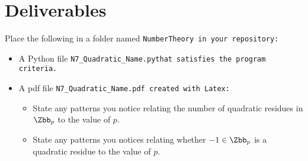 \documentclass{article}
\newcommand\foldername{\tt{NumberTheory} }
\newcommand\filename{\tt{N7\_Quadratic\_Name.py}\;\;}
\begin{document}
\section*{Deliverables}
	
	
	Place the following in a folder named \foldername in your repository:
	\begin{itemize}
		\item A Python file \filename  that satisfies the program criteria.
		\item A pdf file \tt{N7\_Quadratic\_Name.pdf} created with Latex:
		\begin{itemize}
			\item State any patterns you notice relating the number of quadratic residues in $\Zbb_p$ to the value of $p$.
			\item State any patterns you notices relating whether $-1 \in \Zbb_p$ is a quadratic residue to the value of $p$.
		\end{itemize}
	\end{itemize}

	
\end{document}
